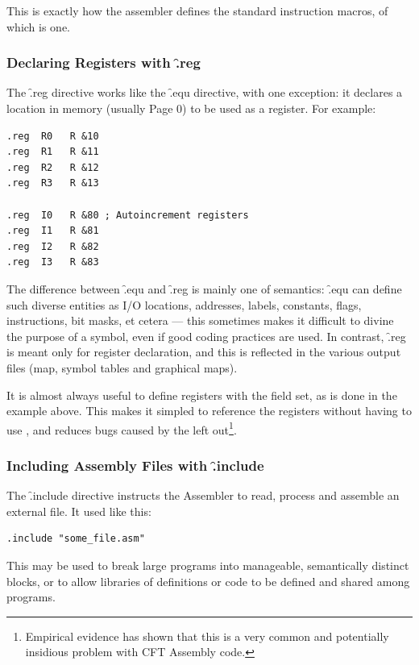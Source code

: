 This is exactly how the assembler defines the standard instruction macros, of
which  is one.



\subsubsection{Declaring Registers with \f{.reg}}

The \f{.reg} directive works like the \f{.equ} directive, with one exception:
it declares a location in memory (usually Page 0) to be used as a register. For
example:

\begin{lstlisting}[language=cftasm]
.reg  R0   R &10
.reg  R1   R &11
.reg  R2   R &12
.reg  R3   R &13

.reg  I0   R &80 ; Autoincrement registers
.reg  I1   R &81
.reg  I2   R &82
.reg  I3   R &83
\end{lstlisting}

The difference between \f{.equ} and \f{.reg} is mainly one of semantics:
\f{.equ} can define such diverse entities as I/O locations, addresses, labels,
constants, flags, instructions, bit masks, et cetera — this sometimes makes it
difficult to divine the purpose of a symbol, even if good coding practices are
used. In contrast, \f{.reg} is meant only for register declaration, and this is
reflected in the various output files (map, symbol tables and graphical maps).

It is almost always useful to define registers with the  field
set, as is done in the example above. This makes it simpled to
reference the registers without having to use , and reduces
bugs caused by the  left out\footnote{Empirical evidence has
  shown that this is a very common and potentially insidious problem
  with CFT Assembly code.}.

\subsubsection{Including Assembly Files with \f{.include}}

The \f{.include} directive instructs the Assembler to read, process and
assemble an external file. It used like this:

\begin{lstlisting}[language=cftasm,numbers=none]
.include "some_file.asm"
\end{lstlisting}

This may be used to break large programs into manageable, semantically distinct
blocks, or to allow libraries of definitions or code to be defined and shared
among programs.



